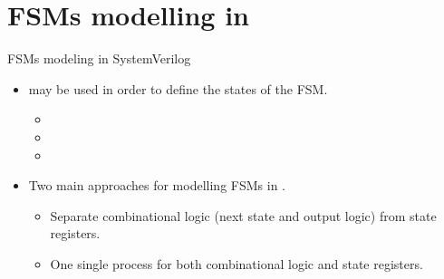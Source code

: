 

%
\section{\acp{FSM} modelling in \SV}
\begin{frame}{FSMs modeling in SystemVerilog}{}
\begin{itemize}
  \item \typedef may be used in order to define the states of the \ac{FSM}.
  \begin{itemize}
    \item[] 
    \item[] 
    \item[] 
  \end{itemize}
  \item Two main approaches for modelling \acp{FSM} in \SV.
  \begin{itemize}
    \item Separate combinational logic (next state and output logic) from state registers.
    \item One single process for both combinational logic and state registers.
  \end{itemize}
\end{itemize}
\end{frame}


%
%

